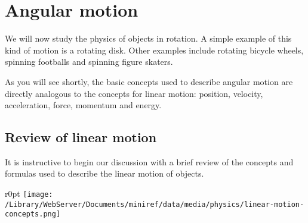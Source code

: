 \documentclass[letterpaper,9pt,journal]{IEEEtran}
\begin{document}
%









\section{Angular motion}
\label{318857367a8b72161a4bda9b7e83ce98}%

We will now study the physics of objects in rotation.
A simple example of this kind of motion is a rotating disk.
Other examples include rotating bicycle wheels, 
spinning footballs and spinning figure skaters.

As you will see shortly, the basic concepts used to describe
angular motion are directly analogous to the concepts for linear motion:
position, velocity, acceleration, force, momentum and energy.

\vspace{-3mm}
\subsection{Review of linear motion}
\label{d407efe356fb48bfb4c0b1d01b89ab3e}%

It is instructive to begin our discussion with a brief review of the 
concepts and formulas used to describe the linear motion of objects.

\begin{wrapfigure}{r}{0pt}
\texttt{[image: /Library/WebServer/Documents/miniref/data/media/physics/linear-motion-concepts.png]}
\end{wrapfigure}
\end{document}
